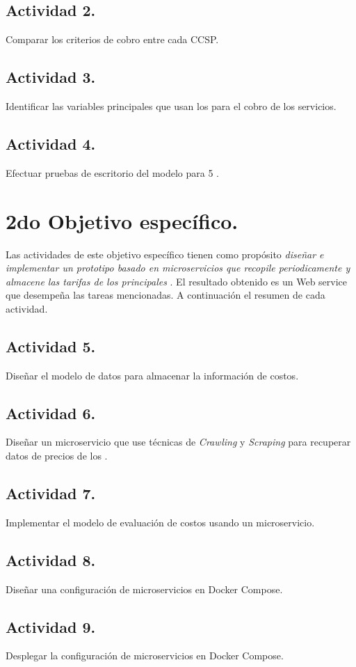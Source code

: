 \subsection{Actividad 2.}
Comparar los criterios de cobro entre cada \acrshort{CCSP}.

\subsection{Actividad 3.}
Identificar las variables principales que usan los  para el cobro de los servicios.

\subsection{Actividad 4.}
Efectuar pruebas de escritorio del modelo para 5 .

\section{2do Objetivo específico.}
Las actividades de este objetivo específico tienen como propósito \emph{diseñar e implementar un prototipo basado en microservicios que recopile periodicamente y almacene las tarifas de los principales }. El resultado obtenido es un Web service que desempeña las tareas mencionadas. A continuación el resumen de cada actividad.

\subsection{Actividad 5.}
Diseñar el modelo de datos para almacenar la información de costos.

\subsection{Actividad 6.}
Diseñar un microservicio que use técnicas de \emph{Crawling} y \emph{Scraping} para recuperar datos de precios de los .

\subsection{Actividad 7.}
Implementar el modelo de evaluación de costos usando un microservicio.

\subsection{Actividad 8.}
Diseñar una configuración de microservicios en \gls{Docker Compose}.

\subsection{Actividad 9.}
Desplegar la configuración de microservicios en \gls{Docker Compose}.


\newpage

